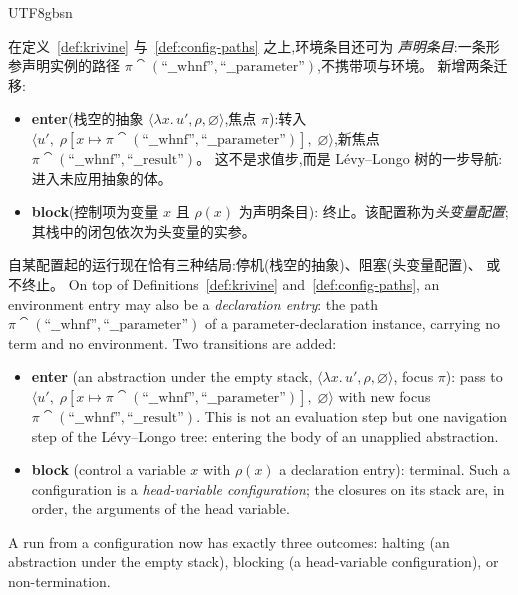 \begin{CJK*}{UTF8}{gbsn}
\begin{definition}\label{def:open-krivine}
  \ifPaperChinese
  在定义~\ref{def:krivine} 与~\ref{def:config-paths} 之上,环境条目还可为
  \emph{声明条目}:一条形参声明实例的路径
  $\pi \cat (\text{``\_\_whnf''}, \text{``\_\_parameter''})$,不携带项与环境。
  新增两条迁移:
  \begin{itemize}
    \item \begin{sloppypar}\textbf{enter}(栈空的抽象 $\langle \lambda x.\, u', \rho,
      \varnothing \rangle$,焦点 $\pi$):转入
      $\langle u',\; \rho[x \mapsto
      \pi \cat (\text{``\_\_whnf''}, \text{``\_\_parameter''})],\;
      \varnothing \rangle$,新焦点
      $\pi \cat (\text{``\_\_whnf''}, \text{``\_\_result''})$。
      这不是求值步,而是 Lévy--Longo 树的一步导航:进入未应用抽象的体。
      \end{sloppypar}
    \item \textbf{block}(控制项为变量 $x$ 且 $\rho(x)$ 为声明条目):
      终止。该配置称为\emph{头变量配置};其栈中的闭包依次为头变量的实参。
  \end{itemize}
  自某配置起的运行现在恰有三种结局:停机(栈空的抽象)、阻塞(头变量配置)、
  或不终止。
  \else
  On top of Definitions~\ref{def:krivine} and~\ref{def:config-paths},
  an environment entry may also be a \emph{declaration entry}: the
  path $\pi \cat (\text{``\_\_whnf''}, \text{``\_\_parameter''})$ of a
  parameter-declaration instance, carrying no term and no
  environment. Two transitions are added:
  \begin{itemize}
    \item \textbf{enter} (an abstraction under the empty stack,
      $\langle \lambda x.\, u', \rho, \varnothing \rangle$, focus
      $\pi$): pass to
      $\langle u',\; \rho[x \mapsto
      \pi \cat (\text{``\_\_whnf''}, \text{``\_\_parameter''})],\;
      \varnothing \rangle$ with new focus
      $\pi \cat (\text{``\_\_whnf''}, \text{``\_\_result''})$. This is not an
      evaluation step but one navigation step of the Lévy--Longo
      tree: entering the body of an unapplied abstraction.
    \item \textbf{block} (control a variable $x$ with $\rho(x)$ a
      declaration entry): terminal. Such a configuration is a
      \emph{head-variable configuration}; the closures on its stack
      are, in order, the arguments of the head variable.
  \end{itemize}
  A run from a configuration now has exactly three outcomes: halting
  (an abstraction under the empty stack), blocking (a head-variable
  configuration), or non-termination.
  \fi
\end{definition}


\end{CJK*}
